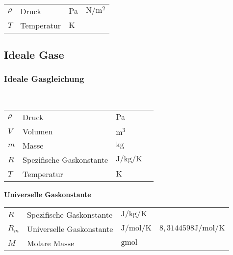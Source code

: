 \documentclass[a4paper, 11pt]{article}
\begin{document}
\begin{minipage}{0.45\textwidth}
  \\

\end{minipage}
\begin{minipage}{0.45\textwidth}

\begin{tabular}{llll}
$\rho$ & Druck & $\si{\pascal} $ & $\si{\newton\per\square\metre}$ \\
$T$ & Temperatur & $\si{\kelvin}$  &  \\
\end{tabular}

\end{minipage}

\subsection{Ideale Gase}

\subsubsection{Ideale Gasgleichung}
\begin{minipage}{0.45\textwidth}

 \\
\end{minipage}
\begin{minipage}{0.45\textwidth}

\begin{tabular}{llll}
$\rho$ & Druck & $\si{\pascal}$ & \\
$V$ & Volumen & $\si{\cubic\meter}$ & \\
$m$ & Masse & $\si{\kilogram}$ &  \\
$R$ & Spezifische Gaskonstante & $\si{\joule\per\kilogram\per\kelvin} $ & $ $ \\
$T$ & Temperatur & $\si{\kelvin}$ & \\
\end{tabular}

\end{minipage} 

\textbf{Universelle Gaskonstante}\\
\begin{minipage}{0.45\textwidth}

\end{minipage}
\begin{minipage}{0.45\textwidth}

\begin{tabular}{llll}
$R$ & Spezifische Gaskonstante & $\si{\joule\per\kilogram\per\kelvin} $ & $ $ \\
$R_{m}$ & Universelle Gaskonstante & $\si{\joule\per\mol\per\kelvin} $ & $8,3144598 \si{\joule\per\mol\per\kelvin}$ \\
$M$ & Molare Masse & $\si{\gram\mol}$ & \\
\end{tabular}

\end{minipage}
\end{document}

